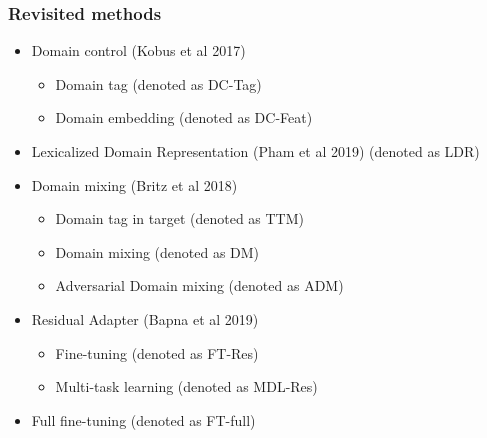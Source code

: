 \documentclass{beamer}
\begin{document}
\begin{frame}
\frametitle{Revisited methods}
\begin{itemize}
	\item<1-> Domain control (Kobus et al 2017)
	\begin{itemize}
		\item<2-> Domain tag (denoted as DC-Tag)
		\item<3-> Domain embedding (denoted as DC-Feat)
	\end{itemize}
	\item<4-> Lexicalized Domain Representation (Pham et al 2019) (denoted as LDR)
	\item<5-> Domain mixing (Britz et al 2018)
	\begin{itemize}
		\item<6-> Domain tag in target (denoted as TTM)
		\item<7-> Domain mixing (denoted as DM)
		\item<8-> Adversarial Domain mixing (denoted as ADM)
	\end{itemize}
	\item<9-> Residual Adapter (Bapna et al 2019)
	\begin{itemize}
		\item<10-> Fine-tuning (denoted as FT-Res)
		\item<11-> Multi-task learning (denoted as MDL-Res)
	\end{itemize}
	\item<12-> Full fine-tuning (denoted as FT-full)
\end{itemize}
\end{frame}
\end{document}
